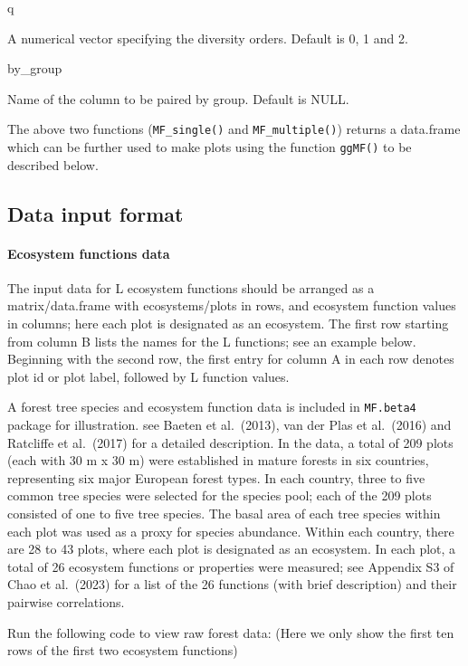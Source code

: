 \documentclass[
]{article}
\begin{document}
q

A numerical vector specifying the diversity orders. Default is 0, 1 and
2.

by\_group

Name of the column to be paired by group. Default is NULL.

The above two functions (\texttt{MF\_single()} and
\texttt{MF\_multiple()}) returns a data.frame which can be further used
to make plots using the function \texttt{ggMF()} to be described below.

\hypertarget{data-input-format}{%
\subsection{Data input format}\label{data-input-format}}

\hypertarget{ecosystem-functions-data}{%
\paragraph{Ecosystem functions data}\label{ecosystem-functions-data}}

The input data for L ecosystem functions should be arranged as a
matrix/data.frame with ecosystems/plots in rows, and ecosystem function
values in columns; here each plot is designated as an ecosystem. The
first row starting from column B lists the names for the L functions;
see an example below. Beginning with the second row, the first entry for
column A in each row denotes plot id or plot label, followed by L
function values.

A forest tree species and ecosystem function data is included in
\texttt{MF.beta4} package for illustration. see Baeten et al.~(2013),
van der Plas et al.~(2016) and Ratcliffe et al.~(2017) for a detailed
description. In the data, a total of 209 plots (each with 30 m x 30 m)
were established in mature forests in six countries, representing six
major European forest types. In each country, three to five common tree
species were selected for the species pool; each of the 209 plots
consisted of one to five tree species. The basal area of each tree
species within each plot was used as a proxy for species abundance.
Within each country, there are 28 to 43 plots, where each plot is
designated as an ecosystem. In each plot, a total of 26 ecosystem
functions or properties were measured; see Appendix S3 of Chao et
al.~(2023) for a list of the 26 functions (with brief description) and
their pairwise correlations.

Run the following code to view raw forest data: (Here we only show the
first ten rows of the first two ecosystem functions)
\end{document}
